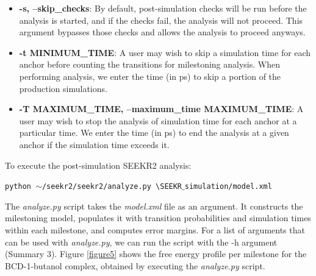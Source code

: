 \documentclass[9pt,training,pubversion]{livecoms}
\begin{document}
\begin{tcolorbox}[colback=black!8!white, colframe=black!50!black, fontlower=\tiny, left=0pt, right=10pt, top=2pt, bottom=2pt]
\begin{itemize}
\item \textbf{-s, --skip\_checks}: By default, post-simulation checks will be run before the analysis is started, and if the checks fail, the analysis will not proceed. This argument bypasses those checks and allows the analysis to proceed anyways.

\item \textbf{-t MINIMUM\_TIME}: A user may wish to skip a simulation time for each anchor before counting the transitions for milestoning analysis. When performing analysis, we enter the time (in ps) to skip a portion of the production simulations.

\item \textbf{-T MAXIMUM\_TIME, --maximum\_time MAXIMUM\_TIME}: A user may wish to stop the analysis of simulation time for each anchor at a particular time. We enter the time (in ps) to end the analysis at a given anchor if the simulation time exceeds it.

\end{itemize}
\end{tcolorbox}




\vspace{2mm}
\noindent To execute the post-simulation SEEKR2 analysis:

\begin{tcolorbox}[colback=black!8!white, colframe=black!50!black, fontlower=\tiny, left=2pt, right=2pt, top=2pt, bottom=2pt] 
\texttt{python $\sim$/seekr2/seekr2/analyze.py  \textbackslash \linebreak SEEKR$\_$simulation/model.xml}
\end{tcolorbox}

\noindent The \textit{analyze.py} script takes the \textit{model.xml} file as an argument. It constructs the milestoning model, populates it with transition probabilities and simulation times within each milestone, and computes error margins. For a list of arguments that can be used with \textit{analyze.py}, we can run the script with the -h argument (Summary 3). Figure \ref{figure5} shows the free energy profile per milestone for the BCD-1-butanol complex, obtained by executing the \textit{analyze.py} script.
\end{document}
